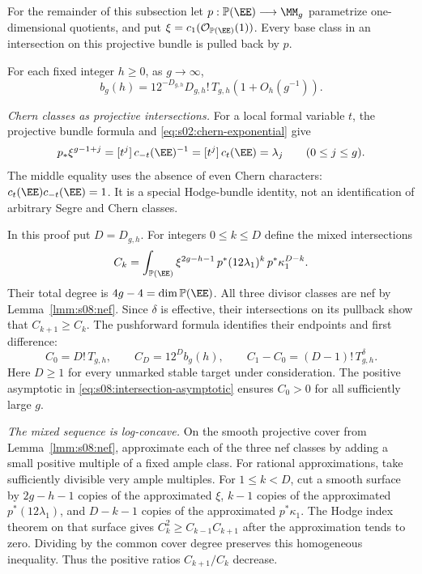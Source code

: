 For the remainder of this subsection let
$p:\mathbb P(\EE)\longrightarrow\MM_g$ parametrize one-dimensional
quotients, and put $\xi=c_1(\mathcal O_{\mathbb P(\EE)}(1))$.
Every base class in an intersection on this projective bundle is
pulled back by $p$.

\begin{prp}\label{prp:s08:background}
For each fixed integer $h\geq0$, as $g\to\infty$,
\begin{equation}\label{eq:s08:background}
 b_g(h)=12^{-D_{g,h}}D_{g,h}!\,T_{g,h}
                                      (1+O_h(g^{-1})).
\end{equation}
\end{prp}
\begin{prf}
\emph{Chern classes as projective intersections.}
For a local formal variable $t$, the projective bundle formula and
\eqref{eq:s02:chern-exponential} give
\begin{equation}\label{eq:s08:projective-pushforward}
 p_*\xi^{g-1+j}
 =[t^j]\,c_{-t}(\EE)^{-1}
 =[t^j]\,c_t(\EE)=\lambda_j
                                      \qquad(0\leq j\leq g).
\end{equation}
The middle equality uses the absence of even Chern characters:
$c_t(\EE)c_{-t}(\EE)=1$. It is a special Hodge-bundle identity,
not an identification of arbitrary Segre and Chern classes.

In this proof put $D=D_{g,h}$. For integers $0\leq k\leq D$ define
the mixed intersections
\begin{equation}\label{eq:s08:mixed-intersections}
 C_k=\int_{\mathbb P(\EE)}
       \xi^{2g-h-1}\,p^*(12\lambda_1)^k\,p^*\kappa_1^{D-k}.
\end{equation}
Their total degree is $4g-4=\dim\mathbb P(\EE)$. All three divisor
classes are nef by Lemma~\ref{lmm:s08:nef}. Since $\delta$ is
effective, their intersections on its pullback show that
$C_{k+1}\geq C_k$. The pushforward formula identifies their
endpoints and first difference:
\begin{equation}\label{eq:s08:mixed-endpoints}
 C_0=D!\,T_{g,h},\qquad
 C_D=12^D b_g(h),\qquad
 C_1-C_0=(D-1)!\,T_{g,h}^{\delta}.
\end{equation}
Here $D\geq1$ for every unmarked stable target under consideration.
The positive asymptotic in
\eqref{eq:s08:intersection-asymptotic} ensures $C_0>0$ for all
sufficiently large $g$.

\smallskip\noindent
\emph{The mixed sequence is log-concave.}
On the smooth projective cover from Lemma~\ref{lmm:s08:nef},
approximate each of the three nef classes by adding a small
positive multiple of a fixed ample class. For rational
approximations, take sufficiently divisible very ample multiples.
For $1\leq k<D$, cut a smooth surface by
$2g-h-1$ copies of the approximated $\xi$,
$k-1$ copies of the approximated $p^*(12\lambda_1)$, and
$D-k-1$ copies of the approximated $p^*\kappa_1$.
The Hodge index theorem on that surface gives
$C_k^2\geq C_{k-1}C_{k+1}$ after the approximation tends to zero.
Dividing by the common cover degree preserves this homogeneous
inequality. Thus the positive ratios $C_{k+1}/C_k$ decrease.


\end{prf}
